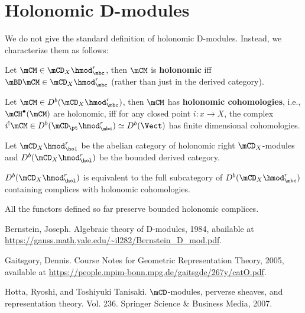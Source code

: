 \section{Holonomic D-modules}

	We do not give the standard definition of holonomic D-modules. Instead, we characterize them as follows:

	\begin{facts}
		Let $\mCM\in \mCD_X\hmod_\mbc^r$, then $\mCM$ is \textbf{holonomic} iff $\mBD \mCM \in  \mCD_X\hmod_\mbc^r$ (rather than just in the derived category).
	\end{facts}

	\begin{facts}
		Let $\mCM\in D^b(\mCD_X\hmod_\mbc^r)$, then $\mCM$ has \textbf{holonomic cohomologies}, i.e., $\mCH^\bullet(\mCM)$ are holonomic, iff for any closed point $i:x\to X$, the complex $i^!\mCM \in  D^b(\mCD_\pt\hmod_\mbc^r)\simeq D^b(\Vect)$ has finite dimensional cohomologies.
	\end{facts}

	\begin{notn}
		Let $\mCD_X\hmod_\hol^r$ be the abelian category of holonomic right $\mCD_X$-modules and $D^b(\mCD_X\hmod_\hol^r)$ be the bounded derived category.
	\end{notn}

	\begin{facts}
		$D^b(\mCD_X\hmod_\hol^r)$ is equivalent to the full subcategory of $D^b(\mCD_X\hmod_\mbc^r)$ containing complices with holonomic cohomologies.
	\end{facts}

	\begin{facts}
		All the functors defined so far preserve bounded holonomic complices.
	\end{facts}
	

	

\begin{thebibliography}{Yau}

	 Bernstein, Joseph. Algebraic theory of D-modules, 1984, abailable at \url{https://gauss.math.yale.edu/~il282/Bernstein_D_mod.pdf}.
	

	 Gaitsgory, Dennis. Course Notes for Geometric Representation Theory, 2005, available at \url{https://people.mpim-bonn.mpg.de/gaitsgde/267y/catO.pdf}.

	 Hotta, Ryoshi, and Toshiyuki Tanisaki. $\mCD$-modules, perverse sheaves, and representation theory. Vol. 236. Springer Science \& Business Media, 2007.
\end{thebibliography}


 


